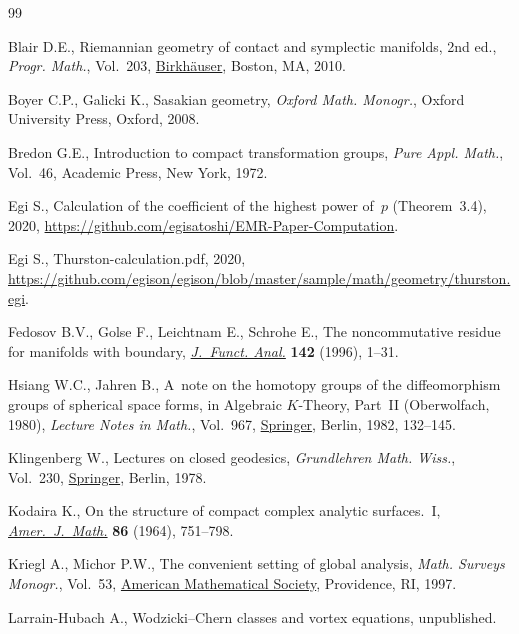 \documentclass[10pt,a4paper]{amsart}
\numberwithin{equation}{section}
\theoremstyle{definition}
\begin{document}
\begin{thebibliography}{99}
\footnotesize\itemsep=0pt

Blair D.E., Riemannian geometry of contact and symplectic manifolds, 2nd ed., \textit{Progr. Math.}, Vol.~203,
 \href{https://doi.org/10.1007/978-0-8176-4959-3}{Birkh\"auser}, Boston, MA,
 2010.

Boyer C.P., Galicki K., Sasakian geometry, \textit{Oxford Math. Monogr.}, Oxford
 University Press, Oxford, 2008.

Bredon G.E., Introduction to compact transformation groups, \textit{Pure Appl.
 Math.}, Vol.~46, Academic Press, New York, 1972.

Egi S., Calculation of the coefficient of the highest power of~$p$
 ({T}heorem~3.4), 2020,
 \url{https://github.com/egisatoshi/EMR-Paper-Computation}.

Egi S., {T}hurston-calculation.pdf, 2020,
 \url{https://github.com/egison/egison/blob/master/sample/math/geometry/thurston.egi}.

Fedosov B.V., Golse F., Leichtnam E., Schrohe E., The noncommutative residue
 for manifolds with boundary,
 \href{https://doi.org/10.1006/jfan.1996.0142}{\textit{J.~Funct. Anal.}}
 \textbf{142} (1996), 1--31.

Hsiang W.C., Jahren B., A~note on the homotopy groups of the diffeomorphism
 groups of spherical space forms, in Algebraic {$K$}-Theory, {P}art~{II}
 ({O}berwolfach, 1980), \textit{Lecture Notes in Math.}, Vol.~967,
 \href{https://doi.org/10.1007/BFb0061901}{Springer}, Berlin, 1982, 132--145.

Klingenberg W., Lectures on closed geodesics, \textit{Grundlehren Math. Wiss.},
 Vol.~230, \href{https://doi.org/10.1007/978-3-642-61881-9}{Springer}, Berlin,
 1978.

Kodaira K., On the structure of compact complex analytic surfaces.~{I},
 \href{https://doi.org/10.2307/2373157}{\textit{Amer.~J.~Math.}} \textbf{86}
 (1964), 751--798.

Kriegl A., Michor P.W., The convenient setting of global analysis,
 \textit{Math. Surveys Monogr.}, Vol.~53,
 \href{https://doi.org/10.1090/surv/053}{American Mathematical Society},
 Providence, RI, 1997.

Larrain-Hubach A., Wodzicki--{C}hern classes and vortex equations,
 {u}npublished.


\end{thebibliography}
\end{document}
